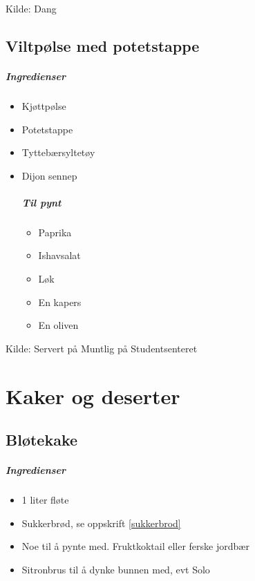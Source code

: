 \documentclass[12pt,a4paper]{book}
\begin{document}
Kilde: Dang
\clearpage{}
\clearpage{}\section{﻿Viltpølse med potetstappe}


\paragraph{Ingredienser}
\begin{itemize}[noitemsep]
	\item Kjøttpølse
	\item Potetstappe
	\item Tyttebærsyltetøy
	\item Dijon sennep
	      \paragraph{Til pynt}
	      \begin{itemize}[noitemsep]
	      	\item Paprika
	      	\item Ishavsalat
	      	\item Løk
	      	\item En kapers
	      	\item En oliven
	      \end{itemize}
\end{itemize}

Kilde: Servert på Muntlig på Studentsenteret
\clearpage{}
 
\chapter{Kaker og deserter}
\clearpage{}\section{﻿Bløtekake}


\paragraph{Ingredienser}
\begin{itemize}[noitemsep]
	\item 1 liter fløte
	\item Sukkerbrød, se oppskrift \ref{sukkerbrod}
	\item Noe til å pynte med. Fruktkoktail eller ferske jordbær
	\item Sitronbrus til å dynke bunnen med, evt Solo
\end{itemize}
\end{document}
